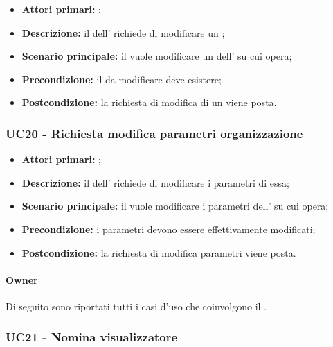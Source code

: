 \documentclass[casi-duso]{subfiles}
\begin{document}
\begin{itemize}
  \item \textbf{Attori primari:} ;
  \item \textbf{Descrizione:} il  dell' richiede di modificare un ;
  \item \textbf{Scenario principale:} il  vuole modificare un  dell' su cui opera;
  \item \textbf{Precondizione:} il  da modificare deve esistere;
  \item \textbf{Postcondizione:} la richiesta di modifica di un  viene posta.

\end{itemize}


\subsubsection{UC20 - Richiesta modifica parametri organizzazione}
\label{subsub:UC20}

\begin{itemize}
  \item \textbf{Attori primari:} ;
  \item \textbf{Descrizione:} il  dell' richiede di modificare i parametri di essa;
  \item \textbf{Scenario principale:} il  vuole modificare i parametri dell' su cui opera;
  \item \textbf{Precondizione:} i parametri devono essere effettivamente modificati;
  \item \textbf{Postcondizione:} la richiesta di modifica parametri viene posta.

\end{itemize}

\paragraph{Owner}
Di seguito sono riportati tutti i casi d'uso che coinvolgono il  .

\subsubsection{UC21 - Nomina visualizzatore}
\label{subsub:UC21}
\end{document}
